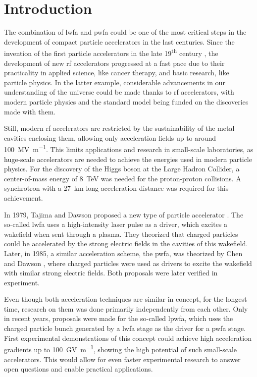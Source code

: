 \documentclass[bachelor_thesis]{subfiles}
\begin{document}
\chapter{Introduction}
The combination of \gls{lwfa} and \gls{pwfa} could be one of the most critical steps in the development of compact particle accelerators in the last centuries.
Since the invention of the first particle accelerators in the late 19\textsuperscript{th} century \cite{Malka2016}, the development of new \gls{rf} accelerators progressed at a fast pace
due to their practicality in applied science, like cancer therapy, and basic research, like particle physics. In the latter example, considerable advancements in our understanding of the universe
could be made thanks to \gls{rf} accelerators, with modern particle physics and the standard model being funded on the discoveries made with them.

Still, modern \gls{rf} accelerators are restricted by the sustainability of the metal cavities enclosing them, allowing only acceleration fields up to around \qty{100}{\mega\volt\per\m}.
This limits applications and research in small-scale laboratories, as huge-scale accelerators are needed to achieve the energies used in modern particle physics.
For the discovery of the Higgs boson at the Large Hadron Collider, a center-of-mass energy of \qty{8}{\TeV} \cite{Aad2012} was needed for the proton-proton collisions.
A synchrotron with a \qty{27}{\km} long acceleration distance was required for this achievement.

In 1979, Tajima and Dawson proposed a new type of particle accelerator \cite{Tajima1979}. The so-called \acrlong{lwfa} uses a high-intensity laser pulse as a driver, which excites a wakefield
when sent through a plasma. They theorized that charged particles could be accelerated by the strong electric fields in the cavities of this wakefield.
Later, in 1985, a similar acceleration scheme, the \acrlong{pwfa}, was theorized by Chen and Dawson \cite{Chen1985}, where charged particles were used as drivers to excite the wakefield with similar strong electric fields.
Both proposals were later verified in experiment. 

Even though both acceleration techniques are similar in concept, for the longest time, research on them was done primarily independently from each other. Only in recent years, 
proposals \cite{Ossa2019} were made for the so-called \gls{lpwfa}, which uses the charged particle bunch generated by a \gls{lwfa} stage as the driver for a \gls{pwfa} stage.
First experimental demonstrations of this concept \cite{Kurz2021} could achieve high acceleration gradients up to \qty{100}{\giga\volt\per\m}, showing the high potential of
such small-scale accelerators. This would allow for even faster experimental research to answer open questions and enable practical applications.
\end{document}
